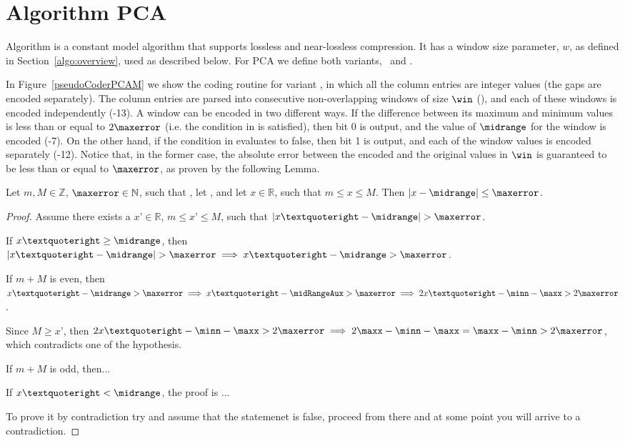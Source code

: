 
\vspace{-15pt}
\section{Algorithm PCA}
\label{algo:pca}


\vspace{-5pt}
Algorithm \textit{\PCAfull} \cite{coder:pca} is a constant model algorithm that supports lossless and near-lossless compression. It has a window size parameter, $w$, as defined in Section~\ref{algo:overview}, used as described below. For PCA we define both variants, \maskalgo\ and \NOmaskalgo.


In Figure~\ref{pseudoCoderPCAM} we show the coding routine for variant \maskalgo, in which all the column entries are integer values (the gaps are encoded separately). The column entries are parsed into consecutive non-overlapping windows of size $\win$ (), and each of these windows is encoded independently (-13). A window can be encoded in two different ways. If the difference between its maximum and minimum values is less than or equal to $2\maxerror$ (i.e. the condition in  is satisfied), then bit 0 is output, and the value of $\midrange$ for the window is encoded (-7). On the other hand, if the condition in  evaluates to false, then bit 1 is output, and each of the window values is encoded separately (-12). Notice that, in the former case, the absolute error between the encoded and the original values in $\win$ is guaranteed to be less than or equal to $\maxerror$, as proven by the following Lemma.


\begin{lemma}
\textnormal{
Let $m, M\in \mathbb{Z}$, $\maxerror \in \mathbb{N}$, such that \validThreTwo, let \calculateMidrange, and let $x\in \mathbb{R}$, such that $m\leq x\leq M$. Then $|x-\midrange|\leq \maxerror$.
}
\end{lemma}

\newcommand{\xOne}{x’}
\begin{proof}
Assume there exists a $\xOne \in \mathbb{R}$, $m\leq \xOne\leq M$, such that $|\xOne-\midrange|> \maxerror$.

If $\xOne\geq\midrange$, then $ |\xOne-\midrange|> \maxerror \implies \xOne-\midrange> \maxerror $.

If $m+M$ is even, then $ \xOne-\midrange > \maxerror \implies \xOne - \midRangeAux> \maxerror \implies 2\xOne - \minn - \maxx > 2\maxerror$.

Since $M\geq \xOne$, then $2\xOne - \minn - \maxx > 2\maxerror \implies 2\maxx - \minn - \maxx = \maxx - \minn> 2\maxerror$, which contradicts one of the hypothesis.

If $m+M$ is odd, then...

If $\xOne<\midrange$, the proof is ... 

To prove it by contradiction try and assume that the statemenet is false,
proceed from there and at some point you will arrive to a contradiction.
\end{proof}





